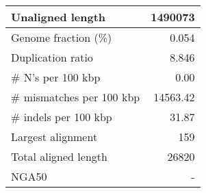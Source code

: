 \documentclass[12pt,a4paper]{article}
\begin{document}
\begin{table}[ht]
\begin{center}
\begin{tabular}{|l*{1}{|r}|}
Unaligned length & 1490073 \\ \hline
Genome fraction (\%) & 0.054 \\ \hline
Duplication ratio & 8.846 \\ \hline
\# N's per 100 kbp & 0.00 \\ \hline
\# mismatches per 100 kbp & 14563.42 \\ \hline
\# indels per 100 kbp & 31.87 \\ \hline
Largest alignment & 159 \\ \hline
Total aligned length & 26820 \\ \hline
NGA50 & - \\ \hline
\end{tabular}
\end{center}
\end{table}
\end{document}

